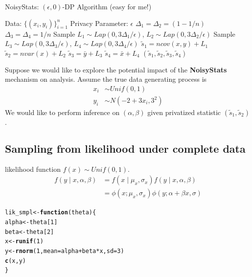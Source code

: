 \documentclass{article}\usepackage[]{graphicx}\usepackage[]{xcolor}
\makeatletter
\newcommand{\hlnum}[1]{\textcolor[rgb]{0.686,0.059,0.569}{#1}}%
\newcommand{\hlopt}[1]{\textcolor[rgb]{0,0,0}{#1}}%
\newcommand{\hlstd}[1]{\textcolor[rgb]{0.345,0.345,0.345}{#1}}%
\newcommand{\hlkwa}[1]{\textcolor[rgb]{0.161,0.373,0.58}{\textbf{#1}}}%
\newcommand{\hlkwb}[1]{\textcolor[rgb]{0.69,0.353,0.396}{#1}}%
\newcommand{\hlkwc}[1]{\textcolor[rgb]{0.333,0.667,0.333}{#1}}%
\newcommand{\hlkwd}[1]{\textcolor[rgb]{0.737,0.353,0.396}{\textbf{#1}}}%
\newenvironment{kframe}{%
 \def\at@end@of@kframe{}%
 \ifinner\ifhmode%
  \def\at@end@of@kframe{\end{minipage}}%
  \begin{minipage}{\columnwidth}%
 \fi\fi%
 \def\FrameCommand##1{\hskip\@totalleftmargin \hskip-\fboxsep
 \colorbox{shadecolor}{##1}\hskip-\fboxsep
     \hskip-\linewidth \hskip-\@totalleftmargin \hskip\columnwidth}%
 \MakeFramed {\advance\hsize-\width
   \@totalleftmargin\z@ \linewidth\hsize
   \@setminipage}}%
 {\par\unskip\endMakeFramed%
 \at@end@of@kframe}
\newenvironment{knitrout}{}{} %
\theoremstyle{definition}
\makeatother
\begin{document}
\begin{algorithm}
\begin{algorithmic}[1]
\caption{NoisyStats: $(\epsilon, 0)$-DP Algorithm (easy for me!)}
\State Data: $\{(x_i,y_i)\}_{i=1}^{n}$
\State Privacy Parameter: $\epsilon$
\State $\Delta_1 = \Delta_2 = (1 - 1/n)$ 
\State $\Delta_3 = \Delta_4 = 1/n$
\State Sample $L_1 \sim Lap(0, 3\Delta_1/\epsilon)$, $L_2 \sim Lap(0, 3\Delta_2/\epsilon)$
\State Sample $L_3 \sim Lap(0, 3\Delta_3/\epsilon)$, $L_4 \sim Lap(0, 3\Delta_4/\epsilon)$
\State $\tilde{s}_1 = ncov(x,y) + L_1$
\State $\tilde{s}_2 = nvar(x) + L_2$
\State $\tilde{s}_3 = \bar{y} + L_3$
\State $\tilde{s}_4 = \bar{x} + L_4$
\State \Return $(\tilde{s}_1,\tilde{s}_2,\tilde{s}_3,\tilde{s}_4)$
\end{algorithmic}
\end{algorithm}

Suppose we would like to explore the potential impact 
of the \textbf{NoisyStats} mechanism on analysis. Assume
the true data generating process is 
\begin{align*}
x_i &\sim Unif(0,1)\\
y_i &\sim N(-2 + 3 x_i, 3^2)
\end{align*}
We would like to perform inference on $(\alpha, \beta)$ 
given privatized statistic $(\tilde{s}_1, \tilde{s}_2)$.

\subsection*{Sampling from likelihood under complete data}
likelihood function $f(x) \sim Unif(0,1)$.
\begin{align*}
f(y \mid x,  \alpha, \beta) 
&= f(x \mid \mu_x, \sigma_x)f(y \mid x, \alpha, \beta)\\
&= \phi(x; \mu_x, \sigma_x)\phi(y; \alpha + \beta x, \sigma)
\end{align*}

\begin{knitrout}
\color{fgcolor}\begin{kframe}
\begin{alltt}
\hlstd{lik_smpl} \hlkwb{<-} \hlkwa{function}\hlstd{(}\hlkwc{theta}\hlstd{) \{}
  \hlstd{alpha} \hlkwb{<-} \hlstd{theta[}\hlnum{1}\hlstd{]}
  \hlstd{beta} \hlkwb{<-} \hlstd{theta[}\hlnum{2}\hlstd{]}
  \hlstd{x} \hlkwb{<-} \hlkwd{runif}\hlstd{(}\hlnum{1}\hlstd{)}
  \hlstd{y} \hlkwb{<-} \hlkwd{rnorm}\hlstd{(}\hlnum{1}\hlstd{,} \hlkwc{mean} \hlstd{= alpha} \hlopt{+} \hlstd{beta} \hlopt{*} \hlstd{x,} \hlkwc{sd} \hlstd{=} \hlnum{3}\hlstd{)}
  \hlkwd{c}\hlstd{(x,y)}
\hlstd{\}}
\end{alltt}
\end{kframe}
\end{knitrout}
\end{document}

